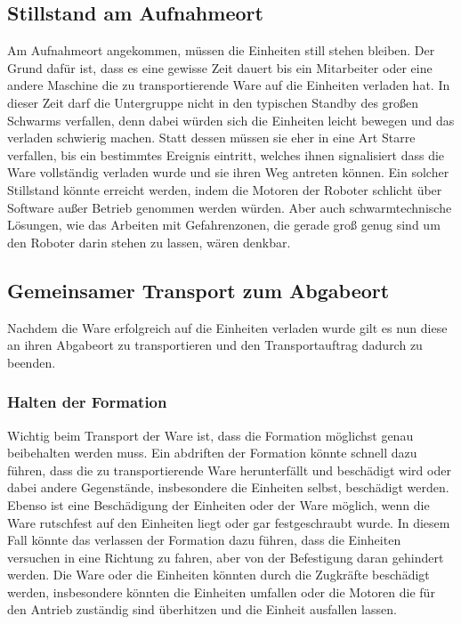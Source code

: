 \subsection*{Stillstand am Aufnahmeort}
Am Aufnahmeort angekommen, müssen die Einheiten still stehen bleiben.
Der Grund dafür ist, dass es eine gewisse Zeit dauert bis ein Mitarbeiter oder eine andere Maschine die zu transportierende Ware auf die Einheiten verladen hat.
In dieser Zeit darf die Untergruppe nicht in den typischen Standby des großen Schwarms verfallen, denn dabei würden sich die Einheiten leicht bewegen und das verladen schwierig machen.
Statt dessen müssen sie eher in eine Art Starre verfallen, bis ein bestimmtes Ereignis eintritt, welches ihnen signalisiert dass die Ware vollständig verladen wurde und sie ihren Weg antreten können.
Ein solcher Stillstand könnte erreicht werden, indem die Motoren der Roboter schlicht über Software außer Betrieb genommen werden würden. Aber auch schwarmtechnische Lösungen, wie das Arbeiten mit Gefahrenzonen, die gerade groß genug sind um den Roboter darin stehen zu lassen, wären denkbar.

\subsection*{Gemeinsamer Transport zum Abgabeort}
Nachdem die Ware erfolgreich auf die Einheiten verladen wurde gilt es nun diese an ihren Abgabeort zu transportieren und den Transportauftrag dadurch zu beenden.

\subsubsection*{Halten der Formation}
Wichtig beim Transport der Ware ist, dass die Formation möglichst genau beibehalten werden muss.
Ein abdriften der Formation könnte schnell dazu führen, dass die zu transportierende Ware herunterfällt und beschädigt wird oder dabei andere Gegenstände, insbesondere die Einheiten selbst, beschädigt werden.
Ebenso ist eine Beschädigung der Einheiten oder der Ware möglich, wenn die Ware rutschfest auf den Einheiten liegt oder gar festgeschraubt wurde.
In diesem Fall könnte das verlassen der Formation dazu führen, dass die Einheiten versuchen in eine Richtung zu fahren, aber von der Befestigung daran gehindert werden.
Die Ware oder die Einheiten könnten durch die Zugkräfte beschädigt werden, insbesondere könnten die Einheiten umfallen oder die Motoren die für den Antrieb zuständig sind überhitzen und die Einheit ausfallen lassen.

